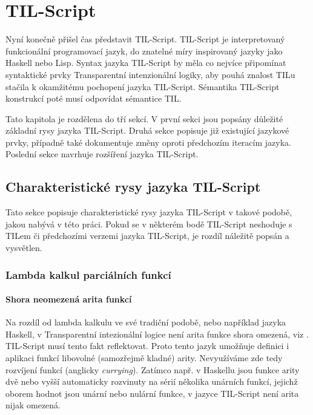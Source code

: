 \chapter{TIL-Script}

Nyní konečně přišel čas představit TIL-Script. TIL-Script je interpretovaný funkcionální
programovací jazyk, do znatelné míry inspirovaný jazyky jako Haskell nebo Lisp. Syntax jazyka
TIL-Script by měla co nejvíce připomínat syntaktické prvky Transparentní intenzionální logiky, aby
pouhá znalost TILu stačila k okamžitému pochopení jazyka TIL-Script. Sémantika TIL-Script konstrukcí
poté musí odpovídat sémantice TIL.

Tato kapitola je rozdělena do tří sekcí. V první sekci jsou popsány důležité základní rysy jazyka
TIL-Script. Druhá sekce popisuje již existující jazykové prvky, případně také dokumentuje změny
oproti předchozím iteracím jazyka. Poslední sekce navrhuje rozšíření jazyka TIL-Script.

\section{Charakteristické rysy jazyka TIL-Script}

Tato sekce popisuje charakteristické rysy jazyka TIL-Script v takové podobě, jakou nabývá v této
práci. Pokud se v některém bodě TIL-Script neshoduje s TILem či předchozími verzemi jazyka
TIL-Script, je rozdíl náležitě popsán a vysvětlen.

\subsection{Lambda kalkul parciálních funkcí}

\subsubsection{Shora neomezená arita funkcí}


Na rozdíl od lambda kalkulu ve své tradiční podobě, nebo například jazyka Haskell, v Transparentní
intezionální logice není arita funkce shora omezená, viz . TIL-Script musí tento
fakt reflektovat. Proto tento jazyk umožňuje definici i aplikaci funkcí libovolné (samozřejmě
kladné) arity. Nevyužíváme zde tedy rozvíjení funkcí (anglicky \textit{currying}). Zatímco např.
v Haskellu jsou funkce arity dvě nebo vyšší automaticky rozvinuty na sérií několika unárních
funkcí, jejichž oborem hodnot jsou unární nebo nulární funkce, v jazyce TIL-Script není arita nijak
omezená.

